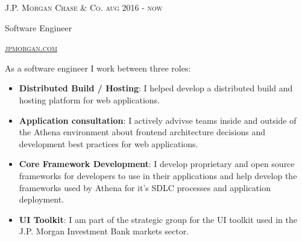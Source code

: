{
  \textsc{\small{J.P. Morgan Chase \& Co. 
      \hfill
          {\raggedleft
              aug 2016 - now
          } \\
      }
  }
  {\raggedright\large {
   Software Engineer
  } \\}

  \textsc{\small\href{http://www.jpmorgan.com}{jpmorgan.com}}

  \normalsize{\raggedright
    As a software engineer I work between three roles:
    \begin{itemize}
    \item \textbf{Distributed Build / Hosting}: I helped develop a distributed build and hosting platform for 
        web applications.
    \item \textbf{Application consultation}: I actively advivse teams inside and outside of the Athena environment
        about frontend architecture decisions and development best practices for web applications.
    \item \textbf{Core Framework Development}: I develop proprietary and open source frameworks for developers 
        to use in their applications and help develop the frameworks used by Athena for it's SDLC processes 
        and application deployment.
    \item \textbf{UI Toolkit}: I am part of the strategic group for the UI toolkit used in the J.P. Morgan Investment
        Bank markets sector.
    \end{itemize}
  }
}